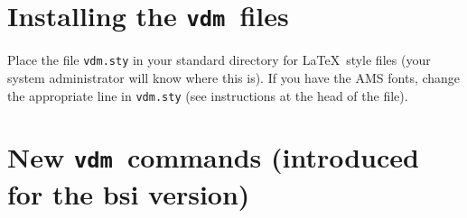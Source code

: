 \documentclass{article}
\newcommand{\Vdm}{{\tt vdm\/}}
\renewcommand{\^}[1]{$\langle${\rm #1\/}$\rangle$}
\begin{document}
\section{Installing the \Vdm\ files}

Place the file {\tt vdm.sty} in your standard directory for \LaTeX\
style files (your system administrator will know where this is).  If
you have the AMS fonts, change the appropriate line in {\tt vdm.sty}
(see instructions at the head of the file).


\section{New \Vdm\ commands (introduced for the {\sc bsi} version)}
\end{document}
